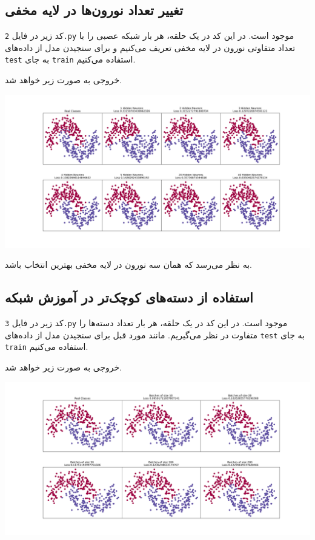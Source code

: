 \documentclass[a4paper, 12pt]{article}
\theoremstyle{definition}
\begin{document}
\subsection{تغییر تعداد نورون‌ها در لایه مخفی}
کد زیر در فایل
\texttt{2.py}
موجود است. در این کد در یک حلقه، هر بار شبکه عصبی را با تعداد متفاوتی نورون در لایه مخفی تعریف می‌کنیم و برای سنجیدن مدل از داده‌های
\texttt{test}
به جای
\texttt{train}
استفاده می‌کنیم.

\LTR

\RTL

خروجی به صورت زیر خواهد شد.

\begin{center}
    \includegraphics[width=\textwidth]{figs/2.png}
\end{center}

به نظر می‌رسد که همان سه نورون در لایه مخفی بهترین انتخاب باشد.

\subsection{استفاده از دسته‌های کوچک‌تر در آموزش شبکه}
کد زیر در فایل
\texttt{3.py}
موجود است. در این کد در یک حلقه، هر بار تعداد دسته‌ها را متفاوت در نظر می‌گیریم. مانند مورد قبل برای سنجیدن مدل از داده‌های
\texttt{test}
به جای
\texttt{train}
استفاده می‌کنیم.

\LTR

\RTL

خروجی به صورت زیر خواهد شد.

\begin{center}
    \includegraphics[width=\textwidth]{figs/3.png}
\end{center}
\end{document}
